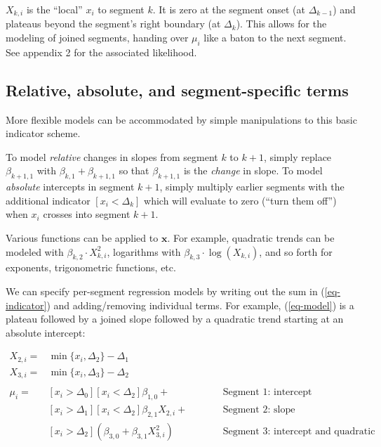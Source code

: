 \documentclass[
  american,
]{article}
\begin{document}
\(X_{k, i}\) is the ``local'' \(x_i\) to segment \(k\). It is zero at the segment onset (at \(\Delta_{k-1}\)) and plateaus beyond the segment's right boundary (at \(\Delta_k\)). This allows for the modeling of joined segments, handing over \(\mu_i\) like a baton to the next segment. See appendix 2 for the associated likelihood.

\hypertarget{extend}{%
\subsection{Relative, absolute, and segment-specific terms}\label{extend}}

More flexible models can be accommodated by simple manipulations to this basic indicator scheme.

To model \emph{relative} changes in slopes from segment \(k\) to \(k+1\), simply replace \(\beta_{k+1, 1}\) with \(\beta_{k, 1} + \beta_{k + 1, 1}\) so that \(\beta_{k + 1, 1}\) is the \emph{change} in slope. To model \emph{absolute} intercepts in segment \(k + 1\), simply multiply earlier segments with the additional indicator \([x_i < \Delta_k]\) which will evaluate to zero (``turn them off'') when \(x_i\) crosses into segment \(k + 1\).

Various functions can be applied to \(\mathbf{x}\). For example, quadratic trends can be modeled with \(\beta_{k, 2} \cdot X_{k,i}^2\), logarithms with \(\beta_{k, 3} \cdot \log(X_{k,i})\), and so forth for exponents, trigonometric functions, etc.

We can specify per-segment regression models by writing out the sum in (\ref{eq-indicator}) and adding/removing individual terms. For example, (\ref{eq-model}) is a plateau followed by a joined slope followed by a quadratic trend starting at an absolute intercept:

\begin{equation}
\label{eq-model}
\begin{aligned}
X_{2, i} = & \min\{x_i, \Delta_2\} - \Delta_1 \\
X_{3, i} = & \min\{x_i, \Delta_3\} - \Delta_2 \\
\\
\mu_i = & [x_i > \Delta_0] [x_i < \Delta_2] \beta_{1, 0} + && \hspace{2em} \text{Segment 1: intercept} \\
         & [x_i > \Delta_1] [x_i < \Delta_2] \beta_{2, 1} X_{2, i} + && \hspace{2em} \text{Segment 2: slope} \\
         & [x_i > \Delta_2] (\beta_{3, 0} + \beta_{3, 1} X_{3, i}^2) && \hspace{2em} \text{Segment 3: intercept and quadratic}
\end{aligned}
\end{equation}
\end{document}
